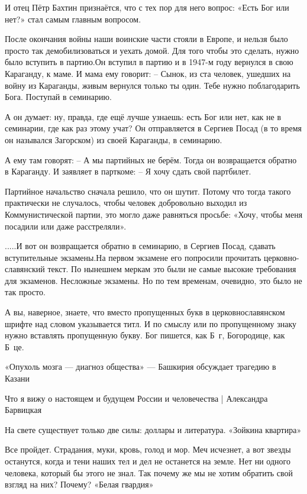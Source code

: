 И отец Пётр Бахтин признаётся, что с тех пор для него вопрос: «Есть Бог или нет?» стал самым главным вопросом.

После окончания войны наши воинские части стояли в Европе, и нельзя было просто так демобилизоваться и уехать домой. Для того чтобы это сделать, нужно было вступить в партию.Он вступил в партию и в 1947-м году вернулся в свою Караганду, к маме.
И мама ему говорит:
– Сынок, из ста человек, ушедших на войну из Караганды, живым вернулся только ты один. Тебе нужно поблагодарить Бога. Поступай в семинарию.

А он думает: ну, правда, где ещё лучше узнаешь: есть Бог или нет, как не в семинарии, где как раз этому учат?
Он отправляется в Сергиев Посад (в то время он назывался Загорском) из своей Караганды, в семинарию.

А ему там говорят:
– А мы партийных не берём.
Тогда он возвращается обратно в Караганду. И заявляет в парткоме:
– Я хочу сдать свой партбилет.

Партийное начальство сначала решило, что он шутит. Потому что тогда такого практически не случалось, чтобы человек добровольно выходил из Коммунистической партии, это могло даже равняться просьбе: «Хочу, чтобы меня посадили или даже расстреляли».

.....И вот он возвращается обратно в семинарию, в Сергиев Посад, сдавать вступительные экзамены.На первом экзамене его попросили прочитать церковно-славянский текст. По нынешнем меркам это были не самые высокие требования для экзаменов. Несложные экзамены. Но по тем временам, очевидно, это было не так просто.

А вы, наверное, знаете, что вместо пропущенных букв в церковнославянском шрифте над словом указывается титл. И по смыслу или по пропущенному знаку нужно вставлять пропущенную букву. Бог пишется, как Б~г, Богородице, как Б~це.

«Опухоль мозга — диагноз общества» — Башкирия обсуждает трагедию в Казани 

Что я вижу о настоящем и будущем России и человечества | Александра Барвицкая


На свете существует только две силы: доллары и литература. «Зойкина квартира» 

Все пройдет. Страдания, муки, кровь, голод и мор. Меч исчезнет, а вот звезды
останутся, когда и тени наших тел и дел не останется на земле. Нет ни одного
человека, который бы этого не знал. Так почему же мы не хотим обратить свой
взгляд на них? Почему? «Белая гвардия» 

